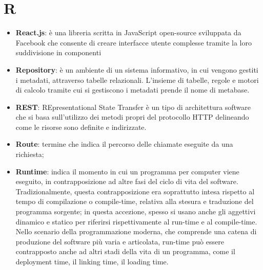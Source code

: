 \section{R}
\begin{itemize}
\item
\textbf{React.js}: è una libreria scritta in JavaScript open-source sviluppata da Facebook che consente di creare interfacce utente complesse tramite la loro suddivisione in componenti
\item
\textbf{Repository}: è un ambiente di un sistema informativo, in cui vengono gestiti i metadati, attraverso tabelle relazionali. L'insieme di tabelle, regole e motori di calcolo tramite cui si gestiscono i metadati prende il nome di metabase. 
\item
\textbf{REST}: REpresentational State Transfer è un tipo di architettura software che si basa sull'utilizzo dei metodi propri del protocollo HTTP delineando come le risorse sono definite e indirizzate.
\item
\textbf{Route}: termine che indica il percorso delle chiamate eseguite da una richiesta;
\item
\textbf{Runtime}: indica il momento in cui un programma per computer viene eseguito, in contrapposizione ad altre fasi del ciclo di vita del software.
Tradizionalmente, questa contrapposizione era soprattutto intesa rispetto al tempo di compilazione o compile-time, relativa alla stesura e traduzione del programma sorgente; in questa accezione, spesso si usano anche gli aggettivi dinamico e statico per riferirsi rispettivamente al run-time e al compile-time. Nello scenario della programmazione moderna, che comprende una catena di produzione del software più varia e articolata, run-time può essere contrapposto anche ad altri stadi della vita di un programma, come il deployment time, il linking time, il loading time.
\end{itemize}